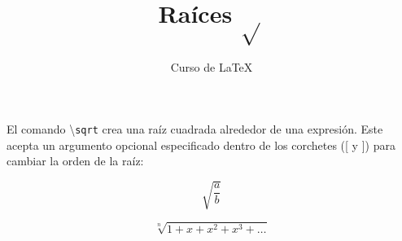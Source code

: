 \documentclass[12pt,letterpaper]{article}
\author{Curso de \LaTeX }
\title{Raíces $ \sqrt{} $}
\begin{document}
\maketitle

El comando \textbackslash\texttt{sqrt} crea una raíz cuadrada alrededor de una expresión. Este acepta un argumento opcional especificado dentro de los corchetes ([ y ]) para cambiar la orden de la raíz:

\begin{equation}
\sqrt{\frac{a}{b}}
\end{equation}

\begin{equation}
\sqrt[n]{1+x+x^2+x^3+\ldots}
\end{equation}
\end{document}
